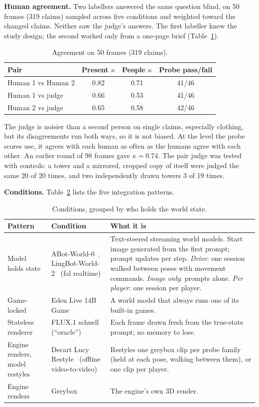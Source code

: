 \documentclass[conference]{IEEEtran}
\begin{document}
\textbf{Human agreement.} Two labellers answered the same question blind, on 50 frames (319 claims) sampled across five conditions and weighted toward the changed claims. Neither saw the judge's answers. The first labeller knew the study design; the second worked only from a one-page brief (Table~\ref{tab:agree}).

\begin{table}[t]
\caption{Agreement on 50 frames (319 claims).}\label{tab:agree}
\centering
\begin{tabular}{@{}lccc@{}}
\toprule
Pair & Present $\kappa$ & People $\kappa$ & Probe pass/fail \\
\midrule
Human 1 vs Human 2 & 0.82 & 0.71 & 41/46 \\
Human 1 vs judge & 0.66 & 0.53 & 41/46 \\
Human 2 vs judge & 0.65 & 0.58 & 42/46 \\
\bottomrule
\end{tabular}
\end{table}

The judge is noisier than a second person on single claims, especially clothing, but its disagreements run both ways, so it is not biased. At the level the probe scores use, it agrees with each human as often as the humans agree with each other. An earlier round of 98 frames gave $\kappa = 0.74$. The pair judge was tested with controls: a tower and a mirrored, cropped copy of itself were judged the same 20 of 20 times, and two independently drawn towers 3 of 19 times.

\textbf{Conditions.} Table~\ref{tab:conditions} lists the five integration patterns.

\begin{table}[t]
\caption{Conditions, grouped by who holds the world state.}\label{tab:conditions}
\centering
\begin{tabular}{@{}p{3.6cm}p{4.2cm}p{9.0cm}@{}}
\toprule
Pattern & Condition & What it is \\
\midrule
Model holds state & ABot-World-0~\cite{abot}, LingBot-World-2~\cite{lingbot} (fal realtime) & Text-steered streaming world models. Start image generated from the first prompt; prompt updates per step. \emph{Drive}: one session walked between poses with movement commands. \emph{Image only}: prompts alone. \emph{Per player}: one session per player. \\
Game-locked & Eden Live 14B Game~\cite{eden} & A world model that always runs one of its built-in games. \\
Stateless renderer & FLUX.1 schnell~\cite{flux} (``oracle'') & Each frame drawn fresh from the true-state prompt; no memory to lose. \\
Engine renders, model restyles & Decart Lucy Restyle~\cite{lucy} (offline video-to-video) & Restyles one greybox clip per probe family (held at each pose, walking between them), or one clip per player. \\
Engine renders & Greybox & The engine's own 3D render. \\
\bottomrule
\end{tabular}
\end{table}
\end{document}
